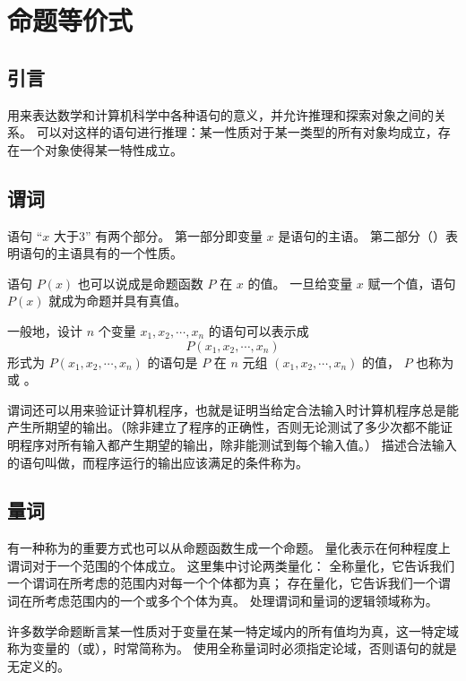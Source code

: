 
\section{命题等价式}
{
    \subsection{引言}
    {
        用来表达数学和计算机科学中各种语句的意义，并允许推理和探索对象之间的关系。
        可以对这样的语句进行推理：某一性质对于某一类型的所有对象均成立，存在一个对象使得某一特性成立。
    }

    \subsection{谓词}
    {
        语句 ``$x$ 大于3'' 有两个部分。
        第一部分即变量 $x$ 是语句的主语。
        第二部分（）表明语句的主语具有的一个性质。

        语句 $P(x)$ 也可以说成是命题函数 $P$ 在 $x$ 的值。
        一旦给变量 $x$ 赋一个值，语句 $P(x)$ 就成为命题并具有真值。

        一般地，设计 $n$ 个变量 $x_1, x_2, \cdots , x_n$ 的语句可以表示成
        $$P(x_1, x_2, \cdots , x_n)$$
        形式为 $P(x_1, x_2, \cdots , x_n)$ 的语句是  $P$ 在 $n$ 元组 $(x_1, x_2, \cdots , x_n)$ 的值， $P$ 也称为 或 。

        {
            谓词还可以用来验证计算机程序，也就是证明当给定合法输入时计算机程序总是能产生所期望的输出。（除非建立了程序的正确性，否则无论测试了多少次都不能证明程序对所有输入都产生期望的输出，除非能测试到每个输入值。）
            描述合法输入的语句叫做，而程序运行的输出应该满足的条件称为。
        }
    }

    \subsection{量词}
    {
        有一种称为的重要方式也可以从命题函数生成一个命题。
        量化表示在何种程度上谓词对于一个范围的个体成立。
        这里集中讨论两类量化：
        全称量化，它告诉我们一个谓词在所考虑的范围内对每一个个体都为真；
        存在量化，它告诉我们一个谓词在所考虑范围内的一个或多个个体为真。
        处理谓词和量词的逻辑领域称为。

        {
            许多数学命题断言某一性质对于变量在某一特定域内的所有值均为真，这一特定域称为变量的（或），时常简称为。
            使用全称量词时必须指定论域，否则语句的就是无定义的。

}}}
